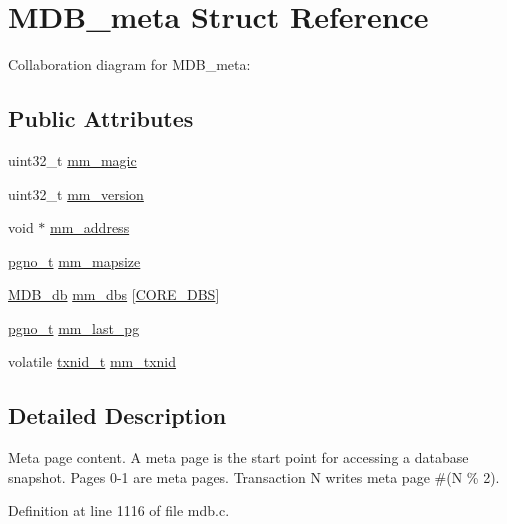 \hypertarget{struct_m_d_b__meta}{}\section{M\+D\+B\+\_\+meta Struct Reference}
\label{struct_m_d_b__meta}


Collaboration diagram for M\+D\+B\+\_\+meta\+:
\subsection*{Public Attributes}
\begin{DoxyCompactItemize}
\item 
uint32\+\_\+t \mbox{\hyperlink{struct_m_d_b__meta_a45631452dce29f76434d607005ff4495}{mm\+\_\+magic}}
\item 
uint32\+\_\+t \mbox{\hyperlink{struct_m_d_b__meta_aff649ecae57a8ace4045776e49957d52}{mm\+\_\+version}}
\item 
void $\ast$ \mbox{\hyperlink{struct_m_d_b__meta_a22a6641d311f707a99231d350308febc}{mm\+\_\+address}}
\item 
\mbox{\hyperlink{group__internal_gadb65f0424c9d3827bf6409087ad555cd}{pgno\+\_\+t}} \mbox{\hyperlink{struct_m_d_b__meta_a25106c008801655d8d956b78a4699451}{mm\+\_\+mapsize}}
\item 
\mbox{\hyperlink{struct_m_d_b__db}{M\+D\+B\+\_\+db}} \mbox{\hyperlink{struct_m_d_b__meta_a16889e9232601af59a9363268e1fe6cd}{mm\+\_\+dbs}} \mbox{[}\mbox{\hyperlink{group__internal_ga9c5573d169b885743bc9208c23c7e82b}{C\+O\+R\+E\+\_\+\+D\+BS}}\mbox{]}
\item 
\mbox{\hyperlink{group__internal_gadb65f0424c9d3827bf6409087ad555cd}{pgno\+\_\+t}} \mbox{\hyperlink{struct_m_d_b__meta_a794e3644abac188a4b57b3f76ee7af40}{mm\+\_\+last\+\_\+pg}}
\item 
volatile \mbox{\hyperlink{group__internal_gabbaef7c9c710f8652a62c32d748c040e}{txnid\+\_\+t}} \mbox{\hyperlink{struct_m_d_b__meta_a87c674e0b87a14a768d4d3e5e785bb05}{mm\+\_\+txnid}}
\end{DoxyCompactItemize}


\subsection{Detailed Description}
Meta page content. A meta page is the start point for accessing a database snapshot. Pages 0-\/1 are meta pages. Transaction N writes meta page \#(N \% 2). 

Definition at line 1116 of file mdb.\+c.



